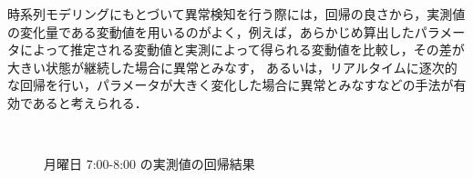 \documentclass[technicalreport]{ieicej}
\begin{document}
時系列モデリングにもとづいて異常検知を行う際には，回帰の良さから，実測値の変化量である変動値を用いるのがよく，例えば，あらかじめ算出したパラメータによって推定される変動値と実測によって得られる変動値を比較し，その差が大きい状態が継続した場合に異常とみなす，
あるいは，リアルタイムに逐次的な回帰を行い，パラメータが大きく変化した場合に異常とみなすなどの手法が有効であると考えられる．

\begin{figure}[tb]
\begin{center}
~
~
\caption{月曜日 7:00-8:00 の実測値の回帰結果}
\label{norm-reg}
\end{center}
\end{figure}
\end{document}
